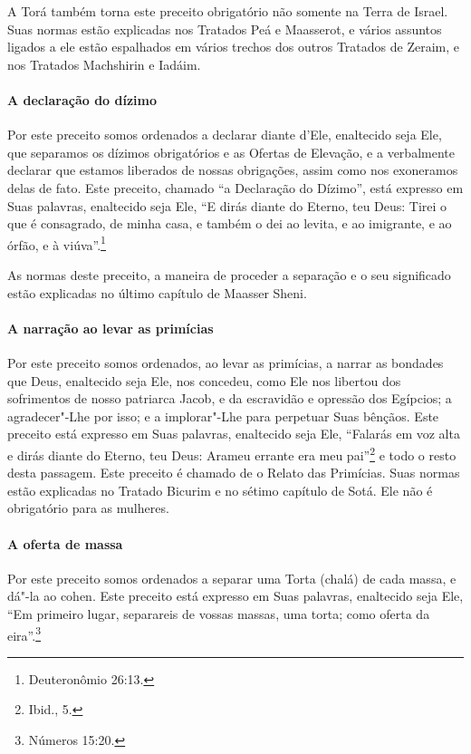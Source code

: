 \begin{multicols}{2}
A Torá\starr{} também torna este preceito obrigatório não somente na Terra de
Israel. Suas normas estão explicadas nos Tratados Peá\starr{} e Maasserot\starr, e
vários assuntos ligados a ele estão espalhados em vários trechos dos
outros Tratados de Zeraim\starr, e nos Tratados Machshirin\starr{} e Iadáim\starr.

\paragraph{A declaração do dízimo}

Por este preceito somos ordenados a declarar diante d'Ele, enaltecido
seja Ele, que separamos os dízimos obrigatórios e as Ofertas de
Elevação, e a verbalmente declarar que estamos liberados de nossas
obrigações, assim como nos exoneramos delas de fato. Este preceito,
chamado ``a Declaração do Dízimo'', está expresso em Suas palavras,
enaltecido seja Ele, ``E dirás diante do Eterno, teu Deus: Tirei o que é
consagrado, de minha casa, e também o dei ao levita\starr, e ao imigrante, e
ao órfão, e à viúva''.\footnote{Deuteronômio 26:13.}

As normas deste preceito, a maneira de proceder a separação e o seu
significado estão explicadas no último capítulo de Maasser Sheni\starr.


\paragraph{A narração ao levar as primícias}

Por este preceito somos ordenados, ao levar as primícias, a narrar as
bondades que Deus, enaltecido seja Ele, nos concedeu, como Ele nos
libertou dos sofrimentos de nosso patriarca Jacob\starr, e da escravidão e
opressão dos Egípcios; a agradecer"-Lhe por isso; e a implorar"-Lhe para
perpetuar Suas bênçãos. Este preceito está expresso em Suas palavras,
enaltecido seja Ele, ``Falarás em voz alta e dirás diante do Eterno, teu
Deus: Arameu errante era meu pai''\footnote{Ibid., 5.} e todo o resto
desta passagem. Este preceito é chamado de o Relato das Primícias. Suas
normas estão explicadas no Tratado Bicurim\starr{} e no sétimo capítulo de Sotá\starr.
Ele não é obrigatório para as mulheres.

\paragraph{A oferta de massa}

Por este preceito somos ordenados a separar uma Torta (chalá\starr) de cada
massa, e dá"-la ao cohen\starr{}. Este preceito está expresso em Suas
palavras, enaltecido seja Ele, ``Em primeiro lugar, separareis de vossas
massas, uma torta; como oferta da eira''.\footnote{Números 15:20.}


\end{multicols}
